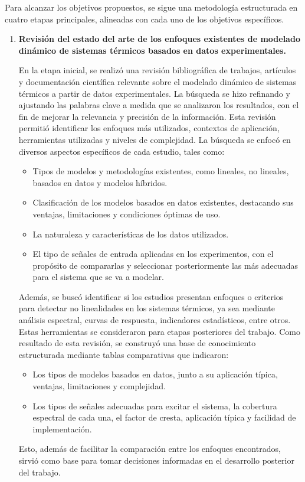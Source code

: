 \documentclass[11pt]{report}
\begin{document}
Para alcanzar los objetivos propuestos, se sigue una metodología estructurada en cuatro etapas principales, alineadas con cada uno de los objetivos específicos.
\begin{enumerate}

\item \textbf{Revisión del estado del arte de los enfoques existentes de modelado dinámico de sistemas térmicos basados en datos experimentales.}

En la etapa inicial, se realizó una revisión bibliográfica de trabajos, artículos y documentación científica relevante sobre el modelado dinámico de sistemas térmicos a partir de datos experimentales. La búsqueda se hizo refinando y ajustando las palabras clave a medida que se analizaron los resultados, con el fin de mejorar la relevancia y precisión de la información. Esta revisión permitió identificar los enfoques más utilizados, contextos de aplicación, herramientas utilizadas y niveles de complejidad. 
La búsqueda se enfocó en diversos aspectos específicos de cada estudio, tales como:
\begin{itemize}

\item Tipos de modelos y metodologías existentes, como lineales, no lineales, basados en datos y modelos híbridos.
\item Clasificación de los modelos basados en datos existentes, destacando sus ventajas, limitaciones y condiciones óptimas de uso.
\item La naturaleza y características de los datos utilizados.
\item El tipo de señales de entrada aplicadas en los experimentos, con el propósito de compararlas y seleccionar posteriormente las más adecuadas para el sistema que se va a modelar.
\end{itemize}
Además, se buscó identificar si los estudios presentan enfoques o criterios para detectar no linealidades en los sistemas térmicos, ya sea mediante análisis espectral, curvas de respuesta, indicadores estadísticos, entre otros. Estas herramientas se consideraron para etapas posteriores del trabajo.
Como resultado de esta revisión, se construyó  una base de conocimiento estructurada mediante tablas comparativas que indicaron:
\begin{itemize}
    \item   Los tipos de modelos basados en datos, junto a su aplicación típica, ventajas, limitaciones y complejidad.
\item Los tipos de señales adecuadas para excitar el sistema, la cobertura espectral de cada una, el factor de cresta, aplicación típica y facilidad de implementación.
\end{itemize}
Esto, además de facilitar la comparación entre los enfoques encontrados, sirvió como base para tomar decisiones informadas en el desarrollo posterior del trabajo.



\end{enumerate}
\end{document}
